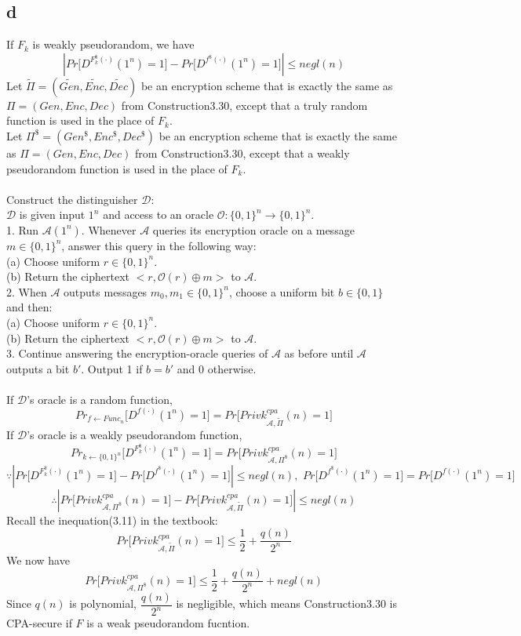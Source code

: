 \documentclass[a4papers]{ctexart}
\begin{document}
\subsection*{d}
If $F_k$ is weakly pseudorandom, we have 
\[ |Pr\big[ D^{F^\$_k(·)}(1^n)=1] - Pr\big[ D^{f^\$(·)}(1^n)=1\big]| \le negl(n)\]
Let $\widetilde{\Pi}=(\widetilde{Gen},\widetilde{Enc},\widetilde{Dec})$ be an encryption scheme that is exactly the same
as $\Pi = (Gen,Enc,Dec)$ from Construction3.30, except that a truly random function is used in the place of $F_k$. \\
Let $\Pi^\$=(Gen^\$,Enc^\$,Dec^\$)$ be an encryption scheme that is exactly the same
as $\Pi = (Gen,Enc,Dec)$ from Construction3.30, except that a weakly pseudorandom function is used in the place of $F_k$. \\ \\
Construct the distinguisher $\mathcal{D}$:\\
$\mathcal{D}$ is given input $1^n$ and access to an oracle $\mathcal{O}:\{0,1\}^n \rightarrow \{0,1\}^n$.\\
1. Run $\mathcal{A}(1^n)$. Whenever $\mathcal{A}$ queries its encryption oracle on a message $m \in\{0,1\}^n $,
answer this query in the following way:\\
\indent (a) Choose uniform $r \in\{0,1\}^n $.\\
\indent (b) Return the ciphertext $<r,\mathcal{O}(r)\oplus m> $ to $\mathcal{A}$.\\
2. When $\mathcal{A}$ outputs messages $m_0,m_1 \in\{0,1\}^n $, choose a uniform bit $b \in\{0,1\}$ and then:\\
\indent (a) Choose uniform $r \in\{0,1\}^n $.\\
\indent (b) Return the ciphertext $<r,\mathcal{O}(r)\oplus m> $ to $\mathcal{A}$.\\
3. Continue answering the encryption-oracle queries of $\mathcal{A}$ as before until $\mathcal{A}$ outputs a bit $b'$.
Output 1 if $b=b'$ and 0 otherwise.\\ \\
If $\mathcal{D}$'s oracle is a random function,
\[ Pr_{f\leftarrow Func_n}\big[ D^{f(·)}(1^n)=1\big] = Pr\big[ Privk^{cpa}_{\mathcal{A},\widetilde{\Pi}}(n)=1\big]\]
If $\mathcal{D}$'s oracle is a weakly pseudorandom function,
\[ Pr_{k\leftarrow \{0,1\}^n}\big[ D^{F^\$_k(·)}(1^n)=1\big] = Pr\big[ Privk^{cpa}_{\mathcal{A},\Pi^\$}(n)=1\big]\]
\[\because |Pr\big[ D^{F^\$_k(·)}(1^n)=1] - Pr\big[ D^{f^\$(·)}(1^n)=1\big]| \le negl(n),\,\,
Pr\big[ D^{f^\$(·)}(1^n)=1\big] = Pr\big[ D^{f(·)}(1^n)=1\big] \]
\[\therefore | Pr\big[ Privk^{cpa}_{\mathcal{A},\Pi^\$}(n)=1\big]-Pr\big[ Privk^{cpa}_{\mathcal{A},\widetilde{\Pi}}(n)=1\big]| \le negl(n) \]
Recall the inequation(3.11) in the textbook:
\[ Pr\big[ Privk^{cpa}_{\mathcal{A},\widetilde{\Pi}}(n)=1\big]\le \dfrac{1}{2} + \dfrac{q(n)}{2^n}\]
We now have
\[Pr\big[ Privk^{cpa}_{\mathcal{A},\Pi^\$}(n)=1\big] \le \dfrac{1}{2} + \dfrac{q(n)}{2^n} + negl(n)\]
Since $q(n)$ is polynomial, $\dfrac{q(n)}{2^n}$ is negligible, which means Construction3.30 is CPA-secure if $F$ is a weak pseudorandom fucntion.
\end{document}
